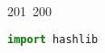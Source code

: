 201~200~\documentclass{article}
\begin{document}
	                                                                                                                                                                                                                                                                                                	                                                                                                                                        	    	                                                                                                	                                                                                                                                                                                                                                                                                                                                	                                                                        	                                                                        	                                                                                                                                        	                                                                                        \begin{lstlisting}[language=Python, caption=Server Password Hashing with SHA3-512]
	                                                                                                                                                                                                                                                                                                	                                                                                                                                        	    	                                                                                                	                                                                                                                                                                                                                                                                                                                                	                                                                        	                                                                        	                                                                                                                                        	                                                                                        import hashlib


\end{lstlisting}
\end{document}
